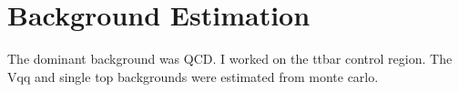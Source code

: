\chapter{Background Estimation} \label{chap:background}

The dominant background was QCD.  I worked on the ttbar control region.  The Vqq
and single top backgrounds were estimated from monte carlo.





